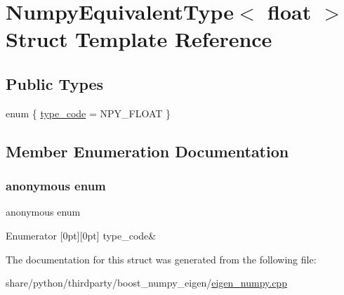 \hypertarget{structNumpyEquivalentType_3_01float_01_4}{}\section{Numpy\+Equivalent\+Type$<$ float $>$ Struct Template Reference}
\label{structNumpyEquivalentType_3_01float_01_4}
\subsection*{Public Types}
\begin{DoxyCompactItemize}
\item 
enum \{ \hyperlink{structNumpyEquivalentType_3_01float_01_4_a90f6a07896abff4a72ad1d09bba098f0abf289a1500417f6924425034c1af8ccf}{type\+\_\+code} = N\+P\+Y\+\_\+\+F\+L\+O\+AT
 \}
\end{DoxyCompactItemize}


\subsection{Member Enumeration Documentation}
\mbox{\label{structNumpyEquivalentType_3_01float_01_4_a90f6a07896abff4a72ad1d09bba098f0}} 
\subsubsection{\texorpdfstring{anonymous enum}{anonymous enum}}
{\footnotesize\ttfamily anonymous enum}

\begin{DoxyEnumFields}{Enumerator}
[0pt][0pt]{}\mbox{\label{structNumpyEquivalentType_3_01float_01_4_a90f6a07896abff4a72ad1d09bba098f0abf289a1500417f6924425034c1af8ccf}} 
type\+\_\+code&\\
\hline

\end{DoxyEnumFields}


The documentation for this struct was generated from the following file\+:\begin{DoxyCompactItemize}
\item 
share/python/thirdparty/boost\+\_\+numpy\+\_\+eigen/\hyperlink{eigen__numpy_8cpp}{eigen\+\_\+numpy.\+cpp}\end{DoxyCompactItemize}
